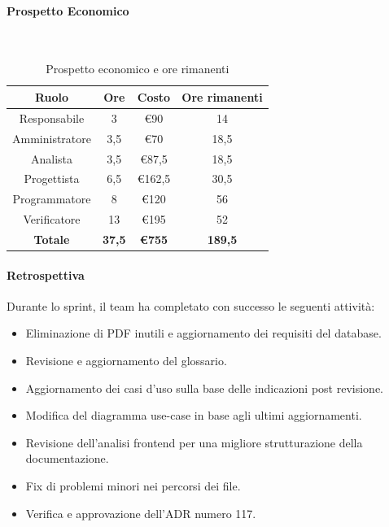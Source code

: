 \documentclass{article}
\begin{document}
                \paragraph{Prospetto Economico}\mbox{}\\
                \begin{table}[H]
                    \centering
                    \begin{tabular}{|c|c|c|c|}
                    \hline
                    \textbf{Ruolo}  & \textbf{Ore}  & \textbf{Costo} & \textbf{Ore rimanenti} \\ \hline
                    Responsabile    & 3             & €90            & 14                     \\ \hline
                    Amministratore  & 3,5           & €70            & 18,5                     \\ \hline
                    Analista        & 3,5           & €87,5          & 18,5                     \\ \hline
                    Progettista     & 6,5           & €162,5         & 30,5                     \\ \hline
                    Programmatore   & 8            & €120           & 56                     \\ \hline
                    Verificatore    & 13            & €195           & 52                     \\ \hline
                    \textbf{Totale} & \textbf{37,5} & \textbf{\euro755}   & \textbf{189,5}         \\ \hline
                    \end{tabular}
                    \caption{Prospetto economico e ore rimanenti}
                \end{table}

                \paragraph{Retrospettiva}
                Durante lo sprint, il team ha completato con successo le seguenti attività:
                \begin{itemize}
                    \item Eliminazione di PDF inutili e aggiornamento dei requisiti del database.
                    \item Revisione e aggiornamento del glossario.
                    \item Aggiornamento dei casi d'uso sulla base delle indicazioni post revisione.
                    \item Modifica del diagramma use-case in base agli ultimi aggiornamenti.
                    \item Revisione dell'analisi frontend per una migliore strutturazione della documentazione.
                    \item Fix di problemi minori nei percorsi dei file.
                    \item Verifica e approvazione dell'ADR numero 117.
                \end{itemize}
                
\end{document}
